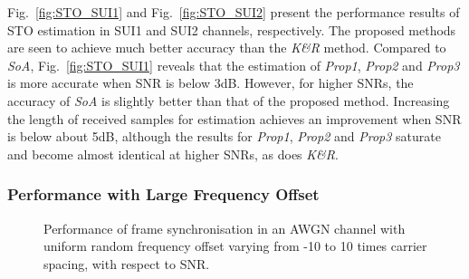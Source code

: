 Fig.~\ref{fig:STO_SUI1} and  Fig.~\ref{fig:STO_SUI2} present the performance results of STO estimation in SUI1 and SUI2 channels, respectively.
The proposed methods are seen to achieve much better accuracy than the \textit{K\&R} method.
Compared to \textit{SoA}, Fig.~\ref{fig:STO_SUI1} reveals that the estimation of \textit{Prop1}, \textit{Prop2} and \textit{Prop3} is more accurate when SNR is below 3{\thinspace}dB.
However, for higher SNRs, the accuracy of \textit{SoA} is slightly better than that of the proposed method.
Increasing the length of received samples for estimation achieves an improvement when SNR is below about 5{\thinspace}dB, although the results for \textit{Prop1}, \textit{Prop2} and \textit{Prop3} saturate and become almost identical at higher SNRs, as does \textit{K\&R}.

		\subsubsection{Performance with Large Frequency Offset}

\begin{figure}[h]
\centering
\caption{Performance of frame synchronisation in an AWGN channel with uniform random frequency offset varying from -10 to 10 times carrier spacing, with respect to SNR.}
\label{fig:STO_AWGN_Fre}
\end{figure}

